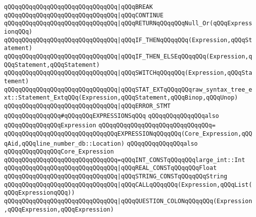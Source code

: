 \verb|qQQqqQQqqQQqqQQqqQQqqQQqqQQqqQQq|\verb#|qQQqBREAK#\newline
\verb|qQQqqQQqqQQqqQQqqQQqqQQqqQQqqQQq|\verb#|qQQqCONTINUE#\newline
\verb|qQQqqQQqqQQqqQQqqQQqqQQqqQQqqQQq|\verb#|qQQqRETURNqQQqqQQqNull_Or(qQQqExpressionqQQq)#\newline
\verb|qQQqqQQqqQQqqQQqqQQqqQQqqQQqqQQq|\verb#|qQQqIF_THENqQQqqQQq(Expression,qQQqStatement)#\newline
\verb|qQQqqQQqqQQqqQQqqQQqqQQqqQQqqQQq|\verb#|qQQqIF_THEN_ELSEqQQqqQQq(Expression,qQQqStatement,qQQqStatement)#\newline
\verb|qQQqqQQqqQQqqQQqqQQqqQQqqQQqqQQq|\verb#|qQQqSWITCHqQQqqQQq(Expression,qQQqStatement)#\newline
\verb|qQQqqQQqqQQqqQQqqQQqqQQqqQQqqQQq|\verb#|qQQqSTAT_EXTqQQqqQQqraw_syntax_tree_ext::Statement_ExtqQQq(Expression,qQQqStatement,qQQqBinop,qQQqUnop)#\newline
\verb|qQQqqQQqqQQqqQQqqQQqqQQqqQQqqQQq|\verb#|qQQqERROR_STMT#\newline
\newline
\verb|qQQqqQQqqQQqqQQq#qQQqqQQqEXPRESSIONSqQQq|\newline
\newline
\verb|qQQqqQQqqQQqqQQqalso|\newline
\verb|qQQqqQQqqQQqqQQqExpression|\newline
\verb|qQQqqQQqqQQqqQQqqQQqqQQqqQQqqQQq=|\newline
\verb|qQQqqQQqqQQqqQQqqQQqqQQqqQQqqQQqEXPRESSIONqQQqqQQq(Core_Expression,qQQqAid,qQQqline_number_db::Location)|\newline
\newline
\verb|qQQqqQQqqQQqqQQqalso|\newline
\verb|qQQqqQQqqQQqqQQqCore_Expression|\newline
\verb|qQQqqQQqqQQqqQQqqQQqqQQqqQQqqQQq=qQQqINT_CONSTqQQqqQQqlarge_int::Int|\newline
\verb|qQQqqQQqqQQqqQQqqQQqqQQqqQQqqQQq|\verb#|qQQqREAL_CONSTqQQqqQQqFloat#\newline
\verb|qQQqqQQqqQQqqQQqqQQqqQQqqQQqqQQq|\verb#|qQQqSTRING_CONSTqQQqqQQqString#\newline
\verb|qQQqqQQqqQQqqQQqqQQqqQQqqQQqqQQq|\verb#|qQQqCALLqQQqqQQq(Expression,qQQqList(qQQqExpressionqQQq))#\newline
\verb|qQQqqQQqqQQqqQQqqQQqqQQqqQQqqQQq|\verb#|qQQqQUESTION_COLONqQQqqQQq(Expression,qQQqExpression,qQQqExpression)#\newline
